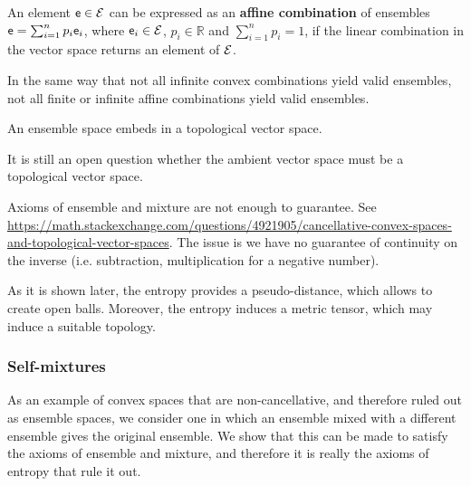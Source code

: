 \begin{defn}
	An element $\mathsf{e} \in \mathcal{E}$ can be expressed as an \textbf{affine combination} of ensembles $\mathsf{e} = \sum_{i=1}^{n} p_i \mathsf{e}_i$, where $\mathsf{e}_i \in \mathcal{E}$, $p_i \in \mathbb{R}$ and $\sum_{i=1}^{n} p_i = 1$, if the linear combination in the vector space returns an element of $\mathcal{E}$.
\end{defn}

\begin{remark}
	In the same way that not all infinite convex combinations yield valid ensembles, not all finite or infinite affine combinations yield valid ensembles.
\end{remark}

\begin{conj}\label{pm_es_ensemblesAreTVS}
	An ensemble space embeds in a topological vector space.
\end{conj}

\begin{remark}
	It is still an open question whether the ambient vector space must be a topological vector space. 
	
	Axioms of ensemble and mixture are not enough to guarantee. See \url{https://math.stackexchange.com/questions/4921905/cancellative-convex-spaces-and-topological-vector-spaces}. The issue is we have no guarantee of continuity on the inverse (i.e. subtraction, multiplication for a negative number).
	
	As it is shown later, the entropy provides a pseudo-distance, which allows to create open balls. Moreover, the entropy induces a metric tensor, which may induce a suitable topology.
\end{remark}

\subsubsection{Self-mixtures}


As an example of convex spaces that are non-cancellative, and therefore ruled out as ensemble spaces, we consider one in which an ensemble mixed with a different ensemble gives the original ensemble. We show that this can be made to satisfy the axioms of ensemble and mixture, and therefore it is really the axioms of entropy that rule it out.

